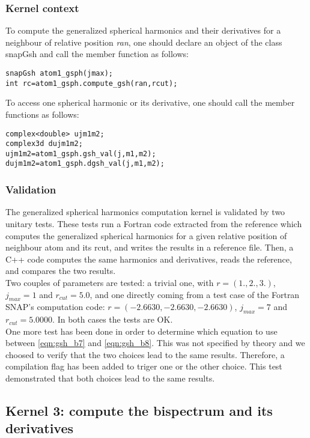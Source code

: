 \documentclass[12pt]{article}
\begin{document}
      \subsubsection{Kernel context}

	To compute the generalized spherical harmonics and their derivatives for a neighbour of relative position \textit{ran}, one should declare an object of the class snapGsh and call the member function as follows:

        \begin{lstlisting}
snapGsh atom1_gsph(jmax);
int rc=atom1_gsph.compute_gsh(ran,rcut);
        \end{lstlisting}
	To access one spherical harmonic or its derivative, one should call the member functions as follows:
	\begin{lstlisting}
complex<double> ujm1m2;
complex3d dujm1m2;
ujm1m2=atom1_gsph.gsh_val(j,m1,m2);
dujm1m2=atom1_gsph.dgsh_val(j,m1,m2);
	\end{lstlisting}
    \subsubsection{Validation}

    The generalized spherical harmonics computation kernel is validated by two unitary tests. These tests run a Fortran code extracted from the reference which computes the generalized spherical harmonics for a given relative position of neighbour atom and its rcut, and writes the results in a reference file. Then, a C++ code computes the same harmonics and derivatives, reads the reference, and compares the two results. \\
Two couples of parameters are tested: a trivial one, with $r=\left(1.,2.,3.\right)$, $j_{max}=1$ and $r_{cut}=5.0$, and one directly coming from a test case of the Fortran SNAP's computation code: $r=\left(-2.6630,-2.6630,-2.6630\right)$, $j_{max}=7$ and $r_{cut}=5.0000$. In both cases the tests are OK. \\
One more test has been done in order to determine which equation to use between \ref{eqn:gsh_b7} and \ref{eqn:gsh_b8}. This was not specified by theory and we choosed to verify that the two choices lead to the same results. Therefore, a compilation flag has been added to triger one or the other choice. This test demonstrated that both choices lead to the same results.
    \subsection{Kernel 3: compute the bispectrum and its derivatives}
\end{document}
